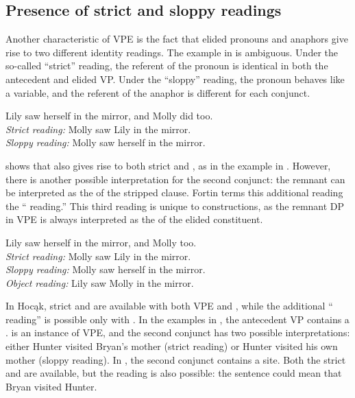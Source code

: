 \documentclass[output=paper]{LSP/langsci}
\begin{document}
\subsection{Presence of strict and sloppy readings}\label{sec:johnson:3.5}

Another characteristic of VPE is the fact that elided pronouns and anaphors give rise to two different identity readings. The  example in  is ambiguous. Under the so-called ``strict'' reading, the referent of the pronoun is identical in both the antecedent and elided VP. Under the ``sloppy'' reading, the pronoun behaves like a variable, and the referent of the anaphor is different for each conjunct.
  
\ea\label{ex:johnson:42} 
Lily saw herself in the mirror, and Molly did too.\\
\textit{Strict reading:} Molly saw Lily in the mirror.\\
\textit{Sloppy reading:} Molly saw herself in the mirror.
\z

\citet{Fortin2007} shows that  also gives rise to both strict and , as in the example in . However, there is another possible interpretation for the second conjunct: the remnant can be interpreted as the  of the stripped clause. Fortin terms this additional reading the `` reading.'' This third reading is unique to  constructions, as the remnant DP in VPE is always interpreted as the  of the elided constituent. 
  
\ea\label{ex:johnson:43} 
Lily saw herself in the mirror, and Molly too.\\
\textit{Strict reading:} Molly saw Lily in the mirror.\\
\textit{Sloppy reading:} Molly saw herself in the mirror.\\
\textit{Object reading:} Lily saw Molly in the mirror.
\z

 
In Hocąk, strict and  are available with both VPE and , while the additional `` reading'' is possible only with . In the examples in , the antecedent VP contains a  .  is an instance of VPE, and the second conjunct has two possible interpretations: either Hunter visited Bryan's mother (strict reading) or Hunter visited his own mother (sloppy reading). In , the second conjunct contains a   site. Both the strict and  are available, but the  reading is also possible: the sentence could mean that Bryan visited Hunter.
 
\end{document}
